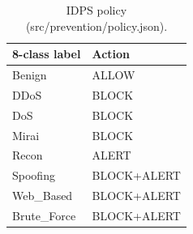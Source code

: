 \begin{table}[!t]
\centering
\caption{IDPS policy (src/prevention/policy.json).}\label{tab:policy}
\scriptsize
\setlength{\tabcolsep}{3pt}
\begin{tabular}{ll}
\toprule
\textbf{8-class label} & \textbf{Action} \\
\midrule
Benign & ALLOW \\
DDoS & BLOCK \\
DoS & BLOCK \\
Mirai & BLOCK \\
Recon & ALERT \\
Spoofing & BLOCK+ALERT \\
Web\_Based & BLOCK+ALERT \\
Brute\_Force & BLOCK+ALERT \\
\bottomrule
\end{tabular}
\end{table}
